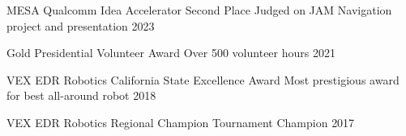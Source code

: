 \begin{cvhonors}

\cvhonor
{MESA Qualcomm Idea Accelerator Second Place} %
{Judged on JAM Navigation project and presentation} %
{} %
{2023} %


\cvhonor
{Gold Presidential Volunteer Award} %
{Over 500 volunteer hours} %
{} %
{2021} %


\cvhonor
{VEX EDR Robotics California State Excellence Award} %
{Most prestigious award for best all-around robot} %
{} %
{2018} %




\cvhonor
{VEX EDR Robotics Regional Champion} %
{Tournament Champion} %
{} %
{2017} %

\end{cvhonors}